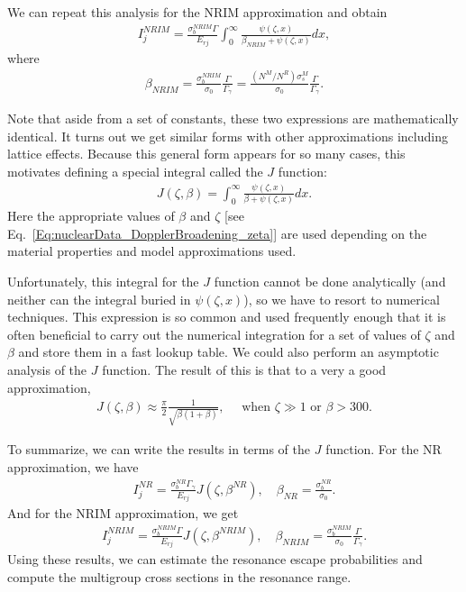 We can repeat this analysis for the NRIM approximation and obtain
\begin{align}
  I_j^{NRIM} = \frac{ \sigma_b^{NRIM} \Gamma }{ E_{rj} } \int_0^\infty \frac{ \psi(\zeta,x) }{ \beta_{NRIM} + \psi(\zeta,x) }  dx , \label{Eq:thermalization_resonanceIntegral_NRIM_slbw_betaPsiForm}
\end{align}
where
\begin{align}
  \beta_{NRIM} = \frac{ \sigma_b^{NRIM} }{ \sigma_0 } \frac{\Gamma}{\Gamma_\gamma} = \frac{ ( N^M / N^R ) \sigma_s^M  }{ \sigma_0 } \frac{\Gamma}{\Gamma_\gamma} .
\end{align}

Note that aside from a set of constants, these two expressions are mathematically identical. It turns out we get similar forms with other approximations including lattice effects. Because this general form appears for so many cases, this motivates defining a special integral called the $J$ function:
\begin{align}
  J(\zeta,\beta) = \int_0^\infty \frac{ \psi(\zeta,x) }{ \beta + \psi(\zeta,x) } dx . \label{Eq:thermalization_JFunc_asymptotic}
\end{align}
Here the appropriate values of $\beta$ and $\zeta$ [see Eq.~\eqref{Eq:nuclearData_DopplerBroadening_zeta}] are used depending on the material properties and model approximations used. 

Unfortunately, this integral for the $J$ function cannot be done analytically (and neither can the integral buried in $\psi(\zeta,x)$), so we have to resort to numerical techniques. This expression is so common and used frequently enough that it is often beneficial to carry out the numerical integration for a set of values of $\zeta$ and $\beta$ and store them in a fast lookup table. We could also perform an asymptotic analysis of the $J$ function. The result of this is that to a very a good approximation,
\begin{align}
  J(\zeta,\beta) \approx \frac{\pi}{2} \frac{1}{\sqrt{\beta ( 1 + \beta) }} , \quad \text{ when } \zeta \gg 1 \text{ or } \beta > 300.
\end{align}

To summarize, we can write the results in terms of the $J$ function. For the NR approximation, we have
\begin{align}
  I_j^{NR} = \frac{ \sigma_b^{NR} \Gamma_\gamma }{ E_{rj} } J( \zeta, \beta^{NR} ), \quad \beta_{NR} = \frac{ \sigma_b^{NR} }{\sigma_0} . \label{Eq:thermalization_resonanceIntegral_NR_slbw}
\end{align}
And for the NRIM approximation, we get
\begin{align}
  I_j^{NRIM} = \frac{ \sigma_b^{NRIM} \Gamma }{ E_{rj} } J(\zeta,\beta^{NRIM} ) , \quad \beta_{NRIM} = \frac{ \sigma_b^{NRIM} }{ \sigma_0 } \frac{\Gamma}{\Gamma_\gamma} . \label{Eq:thermalization_resonanceIntegral_NRIM_slbw}
\end{align}
Using these results, we can estimate the resonance escape probabilities and compute the multigroup cross sections in the resonance range.

